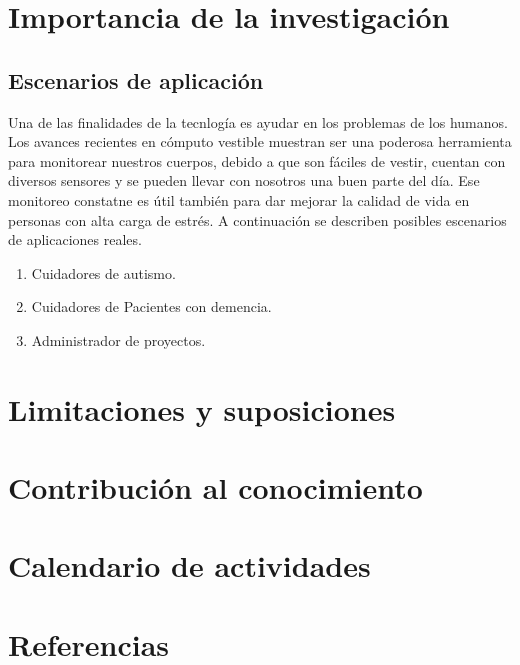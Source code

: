 \documentclass[letterpaper,12pt]{cicese}
\begin{document}
		\chapter{Importancia de la investigaci\'on}
			\section{Escenarios de aplicaci\'on}
					Una de las finalidades de la tecnlog\'ia es ayudar en los problemas de los humanos. Los avances recientes en c\'omputo vestible muestran
					ser una poderosa herramienta para monitorear nuestros cuerpos, debido a que son f\'aciles de vestir, cuentan con diversos sensores y se pueden
					llevar con nosotros una buen parte del d\'ia. Ese monitoreo constatne es \'util tambi\'en para dar mejorar la calidad de vida en personas con alta
					carga de estr\'es. A continuaci\'on se describen posibles escenarios de aplicaciones reales.
				
				\begin{enumerate}
					\item Cuidadores de autismo.
					\item Cuidadores de Pacientes con demencia.
					\item Administrador de proyectos.
				\end{enumerate}
		\chapter{Limitaciones y suposiciones}

		\chapter{Contribuci\'on al conocimiento}
		\chapter{Calendario de actividades}
		\chapter{Referencias}
	
\end{document}
